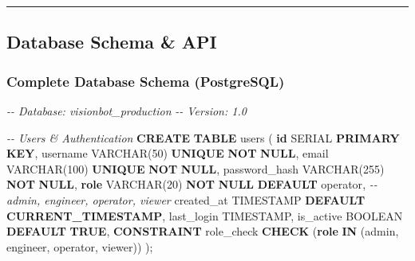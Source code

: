 \documentclass[
]{article}
\newenvironment{Shaded}{\begin{snugshade}}{\end{snugshade}}
\newcommand{\CommentTok}[1]{\textcolor[rgb]{0.56,0.35,0.01}{\textit{#1}}}
\newcommand{\DataTypeTok}[1]{\textcolor[rgb]{0.13,0.29,0.53}{#1}}
\newcommand{\DecValTok}[1]{\textcolor[rgb]{0.00,0.00,0.81}{#1}}
\newcommand{\FunctionTok}[1]{\textcolor[rgb]{0.13,0.29,0.53}{\textbf{#1}}}
\newcommand{\KeywordTok}[1]{\textcolor[rgb]{0.13,0.29,0.53}{\textbf{#1}}}
\newcommand{\NormalTok}[1]{#1}
\newcommand{\StringTok}[1]{\textcolor[rgb]{0.31,0.60,0.02}{#1}}
\begin{document}
\begin{center}\rule{0.5\linewidth}{0.5pt}\end{center}

\hypertarget{database-schema-api}{%
\subsection{Database Schema \& API}\label{database-schema-api}}

\hypertarget{complete-database-schema-postgresql}{%
\subsubsection{Complete Database Schema
(PostgreSQL)}\label{complete-database-schema-postgresql}}

\begin{Shaded}
\begin{Highlighting}[]
\CommentTok{{-}{-} Database: visionbot\_production}
\CommentTok{{-}{-} Version: 1.0}

\CommentTok{{-}{-} Users \& Authentication}
\KeywordTok{CREATE} \KeywordTok{TABLE}\NormalTok{ users (}
    \KeywordTok{id}\NormalTok{ SERIAL }\KeywordTok{PRIMARY} \KeywordTok{KEY}\NormalTok{,}
\NormalTok{    username }\DataTypeTok{VARCHAR}\NormalTok{(}\DecValTok{50}\NormalTok{) }\KeywordTok{UNIQUE} \KeywordTok{NOT} \KeywordTok{NULL}\NormalTok{,}
\NormalTok{    email }\DataTypeTok{VARCHAR}\NormalTok{(}\DecValTok{100}\NormalTok{) }\KeywordTok{UNIQUE} \KeywordTok{NOT} \KeywordTok{NULL}\NormalTok{,}
\NormalTok{    password\_hash }\DataTypeTok{VARCHAR}\NormalTok{(}\DecValTok{255}\NormalTok{) }\KeywordTok{NOT} \KeywordTok{NULL}\NormalTok{,}
    \KeywordTok{role} \DataTypeTok{VARCHAR}\NormalTok{(}\DecValTok{20}\NormalTok{) }\KeywordTok{NOT} \KeywordTok{NULL} \KeywordTok{DEFAULT} \StringTok{\textquotesingle{}operator\textquotesingle{}}\NormalTok{,  }\CommentTok{{-}{-} admin, engineer, operator, viewer}
\NormalTok{    created\_at }\DataTypeTok{TIMESTAMP} \KeywordTok{DEFAULT} \FunctionTok{CURRENT\_TIMESTAMP}\NormalTok{,}
\NormalTok{    last\_login }\DataTypeTok{TIMESTAMP}\NormalTok{,}
\NormalTok{    is\_active }\DataTypeTok{BOOLEAN} \KeywordTok{DEFAULT} \KeywordTok{TRUE}\NormalTok{,}
    \KeywordTok{CONSTRAINT}\NormalTok{ role\_check }\KeywordTok{CHECK}\NormalTok{ (}\KeywordTok{role} \KeywordTok{IN}\NormalTok{ (}\StringTok{\textquotesingle{}admin\textquotesingle{}}\NormalTok{, }\StringTok{\textquotesingle{}engineer\textquotesingle{}}\NormalTok{, }\StringTok{\textquotesingle{}operator\textquotesingle{}}\NormalTok{, }\StringTok{\textquotesingle{}viewer\textquotesingle{}}\NormalTok{))}
\NormalTok{);}


\end{Highlighting}
\end{Shaded}
\end{document}
